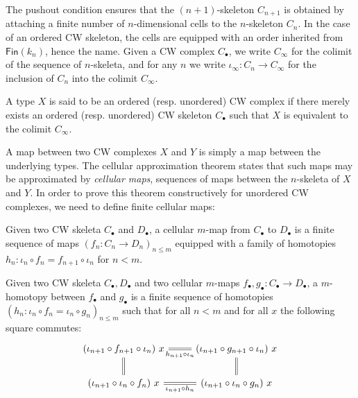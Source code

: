 \documentclass{easychair}
\begin{document}
The pushout condition ensures that the \( (n + 1) \)-skeleton \( C_{n+1} \) is obtained by attaching
a finite number of \( n \)-dimensional cells to the \( n \)-skeleton \( C_n \). In the case of an
ordered CW skeleton, the cells are equipped with an order inherited from \( \mathsf{Fin}(k_n) \),
hence the name.
%
Given a CW complex \( C_{\bullet} \), we write \( C_\infty \) for the colimit of the sequence of
\( n \)-skeleta, and for any \( n \) we write $\iota_\infty : C_n \to C_\infty$ for the inclusion of
$C_n$ into the colimit $C_\infty$.

\begin{definition}[CW complexes]
  A type \( X \) is said to be an ordered (resp. unordered) CW complex if there merely exists an
  ordered (resp. unordered) CW skeleton \( C_{\bullet} \) such that \( X \) is equivalent to the
  colimit \( C_\infty \).
\end{definition}

A map between two CW complexes \( X \) and \( Y \) is simply a map between the underlying types.
%
The cellular approximation theorem states that such maps may be approximated by \emph{cellular maps},
\ie sequences of maps between the \( n \)-skeleta of \( X \) and \( Y \).
%
In order to prove this theorem constructively for unordered CW complexes, we need to define finite
cellular maps:

\begin{definition}
  Given two CW skeleta $C_\bullet$ and $D_\bullet$, a cellular $m$-map from \( C_\bullet \) to \( D_\bullet \)
  is a finite sequence of maps $(f_n : C_n \to D_n)_{n \leq m}$ equipped with a family of homotopies
  $h_n : \iota_n \circ f_{n} = f_{n+1} \circ \iota_n$ for $n < m$.
\end{definition}

\begin{definition}
  Given two CW skeleta $C_\bullet,D_\bullet$ and two cellular $m$-maps $f_\bullet , g_\bullet : C_\bullet \to D_\bullet$, a
  $m$-homotopy between \( f_\bullet \) and \( g_\bullet \) is a finite sequence of homotopies
  \( (h_n : \iota_n \circ f_n = \iota_n \circ g_n)_{n \leq m} \) such that for all \( n < m \) and for all \( x \) the following square commutes:
  \[
\begin{tikzcd}[ampersand replacement=\&]
	{(\iota_{n+1} \circ f_{n+1} \circ \iota_n)~x} \& {(\iota_{n+1} \circ g_{n+1} \circ \iota_n)~x} \\
	{(\iota_{n+1} \circ \iota_n \circ f_n)~x} \& {(\iota_{n+1} \circ \iota_n \circ g_n)~x}
	\arrow[double equal sign distance, -, double, "{h_{n+1} \circ \iota_n}"', from=1-1, to=1-2]
	\arrow[double equal sign distance, -, double, from=1-1, to=2-1]
	\arrow[double equal sign distance, -, double, "{\iota_{n+1} \circ h_n}"', from=2-1, to=2-2]
	\arrow[double equal sign distance, -, double, from=1-2, to=2-2]
\end{tikzcd}
\]
\end{definition}
\end{document}
